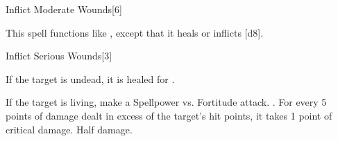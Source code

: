 \begin{spellsection}[Mass]{Inflict Moderate Wounds}[6]
    \begin{spellheader}
    \end{spellheader}
    \begin{spellcontent}
        \begin{spelltargetinginfo}
        \end{spelltargetinginfo}
        \begin{spelleffects}
            \spellspecial This spell functions like , except that it heals or inflicts \spelldamage{}[d8].
        \end{spelleffects}
    \end{spellcontent}
    \begin{spellfooter}
        \miscastexplode
    \end{spellfooter}
\end{spellsection}

\begin{spellsection}{Inflict Serious Wounds}[3]
    \begin{spellheader}
    \end{spellheader}
    \begin{spellcontent}
        \begin{spelltargetinginfo}
        \end{spelltargetinginfo}
        \begin{spelleffects}
            \spelleffect If the target is undead, it is healed for \spelldamage{}.
            \begin{spellattacktriggered}{If the target is living, make a Spellpower vs. Fortitude attack.}
                \spellsuccess {}. For every 5 points of damage dealt in excess of the target's hit points, it takes 1 point of critical damage.
                \spellfailure Half damage.
            \end{spellattacktriggered}
        \end{spelleffects}
    \end{spellcontent}
    \begin{spellfooter}
        \miscastrandom
    \end{spellfooter}
\end{spellsection}

